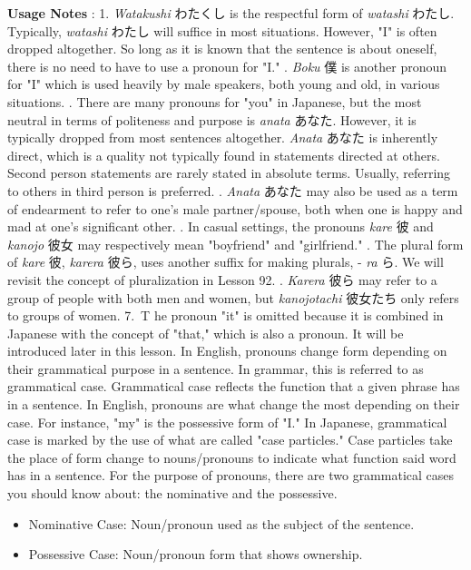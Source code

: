 \par{\textbf{Usage Notes }: }
1. \emph{Watakushi }わたくし is the respectful form of \emph{watashi }わたし. Typically, \emph{watashi }わたし will suffice in most situations. However, "I" is often dropped altogether. So long as it is known that the sentence is about oneself, there is no need to have to use a pronoun for "I." \hfill{}. \emph{Boku }僕 is another pronoun for "I" which is used heavily by male speakers, both young and old, in various situations. \hfill{}. There are many pronouns for "you" in Japanese, but the most neutral in terms of politeness and purpose is \emph{anata }あなた. However, it is typically dropped from most sentences altogether. \emph{Anata }あなた is inherently direct, which is a quality not typically found in statements directed at others. Second person statements are rarely stated in absolute terms. Usually, referring to others in third person is preferred. \hfill{}. \emph{Anata }あなた may also be used as a term of endearment to refer to one's male partner\slash spouse, both when one is happy and mad at one's significant other. \hfill{}. In casual settings, the pronouns \emph{kare }彼 and \emph{kanojo }彼女 may respectively mean "boyfriend" and "girlfriend." \hfill{}. The plural form of \emph{kare }彼, \emph{karera }彼ら, uses another suffix for making plurals, - \emph{ra }ら. We will revisit the concept of pluralization in Lesson 92. \hfill{}. \emph{Karera }彼ら may refer to a group of people with both men and women, but \emph{kanojotachi }彼女たち only refers to groups of women. 7. T he pronoun "it" is omitted because it is combined in Japanese with the concept of "that," which is also a pronoun. It will be introduced later in this lesson.   \hfill\break
 In English, pronouns change form depending on their grammatical purpose in a sentence. In grammar, this is referred to as grammatical case. Grammatical case reflects the function that a given phrase has in a sentence. In English, pronouns are what change the most depending on their case. For instance, "my" is the possessive form of "I." \hfill\break
 \hfill\break
 In Japanese, grammatical case is marked by the use of what are called "case particles." Case particles take the place of form change to nouns\slash pronouns to indicate what function said word has in a sentence. For the purpose of pronouns, there are two grammatical cases you should know about: the nominative and the possessive. 
\begin{itemize}

\item Nominative Case: Noun\slash pronoun used as the subject of the sentence. \hfill\break

\item Possessive Case: Noun\slash pronoun form that shows ownership. 
\end{itemize}
